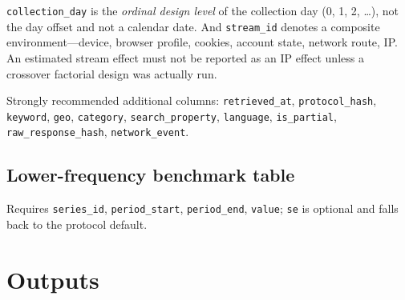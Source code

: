 \documentclass[12pt,a4paper,oneside]{article}
\begin{document}
\begin{remark}
\texttt{collection\_day} is the \emph{ordinal design level} of the collection
day (0, 1, 2, \dots), not the day offset and not a calendar date. And
\texttt{stream\_id} denotes a composite environment---device, browser profile,
cookies, account state, network route, IP. An estimated stream effect must not
be reported as an IP effect unless a crossover factorial design was actually
run.
\end{remark}

Strongly recommended additional columns: \texttt{retrieved\_at},
\texttt{protocol\_hash}, \texttt{keyword}, \texttt{geo}, \texttt{category},
\texttt{search\_property}, \texttt{language}, \texttt{is\_partial},
\texttt{raw\_response\_hash}, \texttt{network\_event}.

\subsection{Lower-frequency benchmark table}

Requires \texttt{series\_id}, \texttt{period\_start}, \texttt{period\_end},
\texttt{value}; \texttt{se} is optional and falls back to the protocol default.

\section{Outputs}
\end{document}
